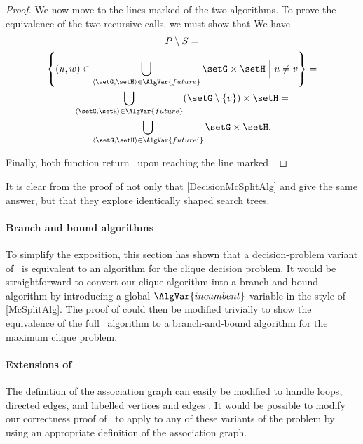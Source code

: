 \begin{proof}
    We now move to the lines marked  of the two algorithms. 
    To prove the equivalence of the two recursive calls, we must show that
    We have
\begin{gather}
    P \setminus S = \\
    \left\{(u,w) \in \bigcup_{\langle \setG,\setH \rangle \in \AlgVar{future}} \setG \times \setH \Bigm| u \not= v\right\} = \\
    \bigcup_{\langle \setG,\setH \rangle \in \AlgVar{future}} (\setG \setminus \{v\}) \times \setH = \\
    \bigcup_{\langle \setG,\setH \rangle \in \AlgVar{future'}} \setG \times \setH.
\end{gather}

    Finally, both function return \boolF\ upon reaching the line marked .
\end{proof}

It is clear from the proof of  not only that
\cref{DecisionMcSplitAlg} and  give the same answer,
but that they explore identically shaped search trees.

\paragraph{Branch and bound algorithms}
To simplify the exposition, this section has shown that a
decision-problem variant of \McSplit\ is equivalent to an algorithm
for the clique decision problem.  It would be straightforward to convert our clique
algorithm into a branch and bound algorithm by introducing a global $\AlgVar{incumbent}$
variable in the style of \cref{McSplitAlg}.  The proof of  could
then be modified trivially to show the equivalence of the full \McSplit\ algorithm to
a branch-and-bound algorithm for the maximum clique problem.

\paragraph{Extensions of \McSplit}
The definition of the association graph can easily be modified to handle loops,
directed edges, and labelled vertices and edges \citep{LeviG}.  It would be
possible to modify our correctness proof of \McSplit\ to apply to any of these
variants of the problem by using an appropriate definition of the association
graph.

